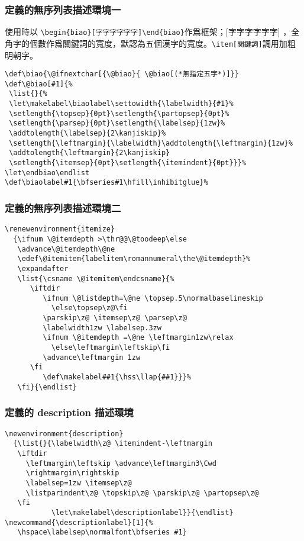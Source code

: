 \subsubsection{定義的無序列表描述環境一}

\par 使用時以 \verb+\begin{biao}[字字字字字字]\end{biao}+作爲框架；[字字字字字字]
，全角字的個數作爲關鍵詞的寬度，默認為五個漢字的寬度。\verb+\item[関鍵詞]+調用加粗明朝字。
\begin{lstlisting}[firstnumber=1093]
\def\biao{\@ifnextchar[{\@biao}{ \@biao[(*無指定五字*)]}}
\def\@biao[#1]{%
 \list{}{%
 \let\makelabel\biaolabel\settowidth{\labelwidth}{#1}%
 \setlength{\topsep}{0pt}\setlength{\partopsep}{0pt}%
 \setlength{\parsep}{0pt}\setlength{\labelsep}{1zw}%
 \addtolength{\labelsep}{2\kanjiskip}%
 \setlength{\leftmargin}{\labelwidth}\addtolength{\leftmargin}{1zw}%
 \addtolength{\leftmargin}{2\kanjiskip}
 \setlength{\itemsep}{0pt}\setlength{\itemindent}{0pt}}}%
\let\endbiao\endlist
\def\biaolabel#1{\bfseries#1\hfill\inhibitglue}%
\end{lstlisting}

\subsubsection{定義的無序列表描述環境二}

\begin{lstlisting}[firstnumber=1106]
\renewenvironment{itemize}
  {\ifnum \@itemdepth >\thr@@\@toodeep\else
   \advance\@itemdepth\@ne
   \edef\@itemitem{labelitem\romannumeral\the\@itemdepth}%
   \expandafter
   \list{\csname \@itemitem\endcsname}{%
      \iftdir
         \ifnum \@listdepth=\@ne \topsep.5\normalbaselineskip
           \else\topsep\z@\fi
         \parskip\z@ \itemsep\z@ \parsep\z@
         \labelwidth1zw \labelsep.3zw
         \ifnum \@itemdepth =\@ne \leftmargin1zw\relax
           \else\leftmargin\leftskip\fi
         \advance\leftmargin 1zw
      \fi
         \def\makelabel##1{\hss\llap{##1}}}%
   \fi}{\endlist}
\end{lstlisting}



\subsubsection{定義的 description 描述環境}

\begin{lstlisting}[firstnumber=1123]
\newenvironment{description}
  {\list{}{\labelwidth\z@ \itemindent-\leftmargin
   \iftdir
     \leftmargin\leftskip \advance\leftmargin3\Cwd
     \rightmargin\rightskip
     \labelsep=1zw \itemsep\z@
     \listparindent\z@ \topskip\z@ \parskip\z@ \partopsep\z@
   \fi
           \let\makelabel\descriptionlabel}}{\endlist}
\newcommand{\descriptionlabel}[1]{%
   \hspace\labelsep\normalfont\bfseries #1}
\end{lstlisting}

